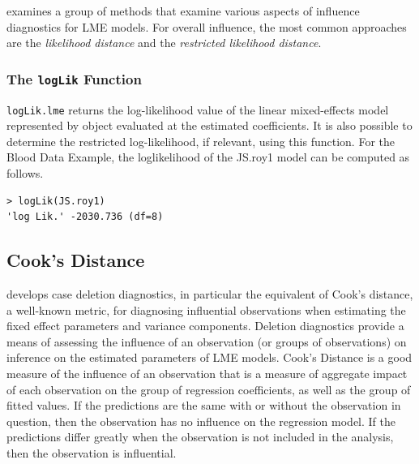 \documentclass[Main.tex]{subfiles}
\begin{document}
\citet{west} examines a group of methods that examine various aspects of influence diagnostics for LME models.
For overall influence, the most common approaches are the \textit{likelihood distance} and the \textit{restricted likelihood distance}.

\subsubsection{The \texttt{logLik} Function}
\texttt{logLik.lme} returns the log-likelihood value of the linear mixed-effects model represented by object evaluated at the estimated coefficients. It is also possible to determine the restricted log-likelihood, if relevant, using this function. For the Blood Data Example,  the loglikelihood of the JS.roy1 model can be computed as follows.
\begin{framed}
\begin{verbatim}
> logLik(JS.roy1)
'log Lik.' -2030.736 (df=8)
\end{verbatim}
\end{framed}
\newpage
\subsection{Cook's Distance}
\citet{CPJ} develops  case deletion diagnostics, in particular the equivalent of  Cook's distance, a well-known metric, for diagnosing influential observations when estimating the fixed effect parameters and variance components. Deletion diagnostics provide a means of assessing the influence of an observation (or groups of observations) on inference on the estimated parameters of LME models. 
Cook's Distance is a good measure of the influence of an observation that is a measure of aggregate impact of each observation on the group of regression coefficients, as well as the group of fitted values.
If the predictions are the same with or without the observation in question, then the observation has no influence on the regression model. If the predictions differ greatly when the observation is not included in the analysis, then the observation is influential.
\end{document}
